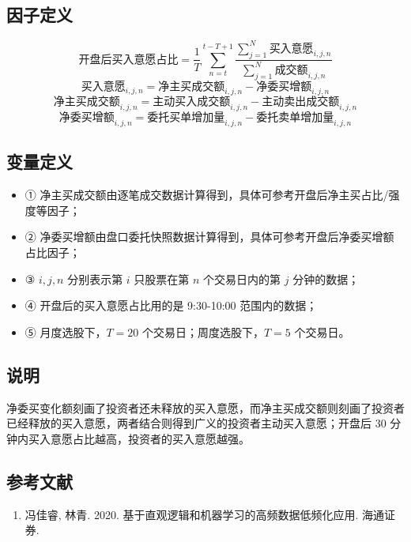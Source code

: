 \documentclass{article}
\begin{document}
\subsection{因子定义}


\begin{equation}
    \text{开盘后买入意愿占比} = \frac{1}{T} \sum_{n=t}^{t-T+1} \frac{\sum_{j=1}^{N} \text{买入意愿}_{i,j,n}}{\sum_{j=1}^{N} \text{成交额}_{i,j,n}}
\end{equation}
\begin{equation}
    \text{买入意愿}_{i,j,n} = \text{净主买成交额}_{i,j,n} - \text{净委买增额}_{i,j,n}
\end{equation}
\begin{equation}
    \text{净主买成交额}_{i,j,n} = \text{主动买入成交额}_{i,j,n} - \text{主动卖出成交额}_{i,j,n}
\end{equation}
\begin{equation}
    \text{净委买增额}_{i,j,n} = \text{委托买单增加量}_{i,j,n} - \text{委托卖单增加量}_{i,j,n}
\end{equation}

\subsection{变量定义}
\begin{itemize}
    \item ① 净主买成交额由逐笔成交数据计算得到，具体可参考开盘后净主买占比/强度等因子；
    \item ② 净委买增额由盘口委托快照数据计算得到，具体可参考开盘后净委买增额占比因子；
    \item ③ \( i, j, n \) 分别表示第 \( i \) 只股票在第 \( n \) 个交易日内的第 \( j \) 分钟的数据；
    \item ④ 开盘后的买入意愿占比用的是 9:30-10:00 范围内的数据；
    \item ⑤ 月度选股下，\( T=20 \) 个交易日；周度选股下，\( T=5 \) 个交易日。
\end{itemize}

\subsection{说明}
净委买变化额刻画了投资者还未释放的买入意愿，而净主买成交额则刻画了投资者已经释放的买入意愿，两者结合则得到广义的投资者主动买入意愿；开盘后 30 分钟内买入意愿占比越高，投资者的买入意愿越强。

\subsection{参考文献}
\begin{enumerate}
    \item 冯佳睿, 林青. 2020. 基于直观逻辑和机器学习的高频数据低频化应用. 海通证券.
\end{enumerate}
\end{document}
